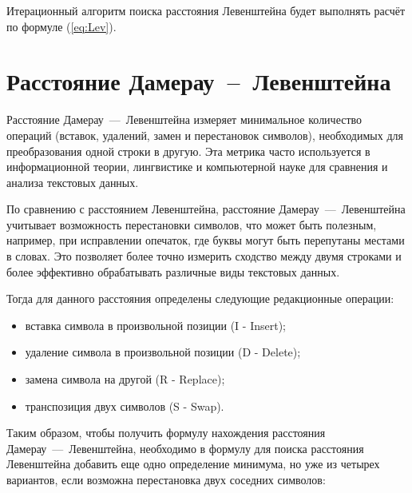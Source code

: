 Итерационный алгоритм поиска расстояния Левенштейна будет выполнять расчёт по формуле (\ref{eq:Lev}).

\section{Расстояние Дамерау~--~Левенштейна}
Расстояние Дамерау~---~Левенштейна измеряет минимальное количество операций (вставок, удалений, замен и перестановок символов), необходимых для преобразования одной строки в другую. Эта метрика часто используется в информационной теории, лингвистике и компьютерной науке для сравнения и анализа текстовых данных.

По сравнению с расстоянием Левенштейна, расстояние Дамерау~---~Левенштейна учитывает возможность перестановки символов, что может быть полезным, например, при исправлении опечаток, где буквы могут быть перепутаны местами в словах. Это позволяет более точно измерить сходство между двумя строками и более эффективно обрабатывать различные виды текстовых данных.

Тогда для данного расстояния определены следующие редакционные операции:
\begin{itemize}
        \item вставка символа в произвольной позиции (I - Insert);
        \item удаление символа в произвольной позиции (D - Delete);
        \item замена символа на другой (R - Replace);
        \item транспозиция двух символов (S - Swap).
\end{itemize} 

Таким образом, чтобы получить формулу нахождения расстояния Дамерау~---~Левенштейна, необходимо в формулу для поиска расстояния Левенштейна добавить еще одно определение минимума, но уже из четырех вариантов, если возможна перестановка двух соседних символов:


